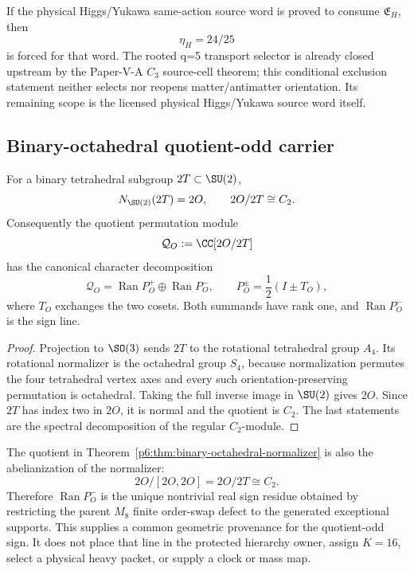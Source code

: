 \documentclass[12pt,a4paper]{article}
\newcommand{\Ran}{\operatorname{Ran}}
\begin{document}
\begin{corollary}
\label{p6:cor:v181-conditional-higgs-exclusion-value}
If the physical Higgs/Yukawa same-action source word is proved to consume
$\mathfrak E_H$, then
\[
 \boxed{\eta_H=24/25}
\]
is forced for that word.  The rooted q=5 transport selector is already
closed upstream by the Paper-V-A $C_3$ source-cell theorem; this conditional
exclusion statement neither selects nor reopens matter/antimatter orientation.
Its remaining scope is the licensed physical Higgs/Yukawa source word itself.
\end{corollary}

\label{p6:part:conditional-model}

\subsection{Binary-octahedral quotient-odd carrier}
\label{p6:sec:heavy-carrier}

\begin{theorem}
\label{p6:thm:binary-octahedral-normalizer}
For a binary tetrahedral subgroup \(2T\subset\SU(2)\),
\[
N_{\SU(2)}(2T)=2O,
\qquad
2O/2T\cong C_2.
\]
Consequently the quotient permutation module
\[
\mathcal Q_O:=\CC[2O/2T]
\]
has the canonical character decomposition
\[
\mathcal Q_O
=
\Ran P_O^+\oplus\Ran P_O^-,
\qquad
P_O^\pm=\frac12(I\pm T_O),
\]
where \(T_O\) exchanges the two cosets.  Both summands have rank one, and
\(\Ran P_O^-\) is the sign line.
\end{theorem}

\begin{proof}
Projection to \(\SO(3)\) sends \(2T\) to the rotational tetrahedral group
\(A_4\).  Its rotational normalizer is the octahedral group \(S_4\), because
normalization permutes the four tetrahedral vertex axes and every such
orientation-preserving permutation is octahedral.  Taking the full inverse
image in \(\SU(2)\) gives \(2O\).  Since \(2T\) has index two in \(2O\), it is
normal and the quotient is \(C_2\).  The last statements are the spectral
decomposition of the regular \(C_2\)-module.
\end{proof}

\begin{corollary}
\label{p6:cor:v188-heavy-sign-defect-provenance}
The quotient in Theorem~\ref{p6:thm:binary-octahedral-normalizer} is also the
abelianization of the normalizer:
\[
 \boxed{2O/[2O,2O]=2O/2T\cong C_2.}
\]
Therefore $\Ran P_O^-$ is the unique nontrivial real sign residue obtained by
restricting the parent $M_8$ finite order-swap defect to the generated
exceptional supports.  This supplies a common geometric provenance for the
quotient-odd sign.  It does not place that line in the protected hierarchy
owner, assign $K=16$, select a physical heavy packet, or supply a clock or
mass map.
\end{corollary}
\end{document}
